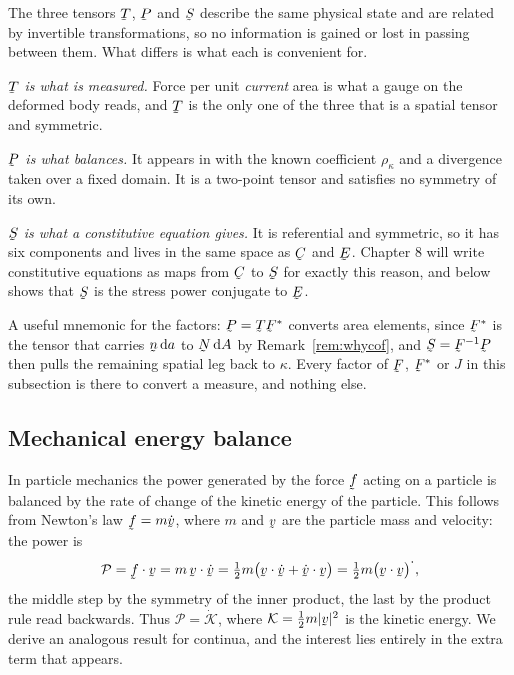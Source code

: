 
\begin{remark}\label{rem:ch6threestress}
The three tensors $\bT$, $\bP$ and $\bS$ describe the same physical
state and are related by invertible transformations, so no information
is gained or lost in passing between them. What differs is what each is
convenient for.

\emph{$\bT$ is what is measured.} Force per unit \emph{current} area is
what a gauge on the deformed body reads, and $\bT$ is the only one of
the three that is a spatial tensor and symmetric.

\emph{$\bP$ is what balances.} It appears in  with the known
coefficient $\rho_{\kappa}$ and a divergence taken over a fixed domain.
It is a two-point tensor and satisfies no symmetry of its own.

\emph{$\bS$ is what a constitutive equation gives.} It is referential
and symmetric, so it has six components and lives in the same space as
$\bC$ and $\bE$. Chapter 8 will write constitutive equations as maps
from $\bC$ to $\bS$ for exactly this reason, and  below
shows that $\bS$ is the stress power conjugate to $\bE$.

A useful mnemonic for the factors: $\bP=\bT\bF^{*}$ converts area
elements, since $\bF^{*}$ is the tensor that carries $\bn\,\dl a$ to
$\bN\,\dl A$ by Remark~\ref{rem:whycof}, and $\bS=\bF^{-1}\bP$ then
pulls the remaining spatial leg back to $\kappa$. Every factor of
$\bF$, $\bF^{*}$ or $J$ in this subsection is there to convert a
measure, and nothing else.
\end{remark}

\subsection{Mechanical energy balance}\label{sec:ch6mechen}

In particle mechanics the power generated by the force $\vek{f}$ acting
on a particle is balanced by the rate of change of the kinetic energy
of the particle. This follows from Newton's law $\vek{f}=m\dot\bv$,
where $m$ and $\bv$ are the particle mass and velocity: the power is
\[
   \mathcal{P}=\ip{\vek{f}}\bv=m\,\ip\bv{\dot\bv}
   =\tfrac12m\big(\ip\bv{\dot\bv}+\ip{\dot\bv}\bv\big)
   =\tfrac12m\big(\ip\bv\bv\big)^{\textstyle\cdot},
\]
the middle step by the symmetry of the inner product, the last by the
product rule read backwards. Thus $\mathcal{P}=\dot{\mathcal{K}}$,
where $\mathcal{K}=\tfrac12m|\bv|^{2}$ is the kinetic energy. We derive
an analogous result for continua, and the interest lies entirely in the
extra term that appears.

